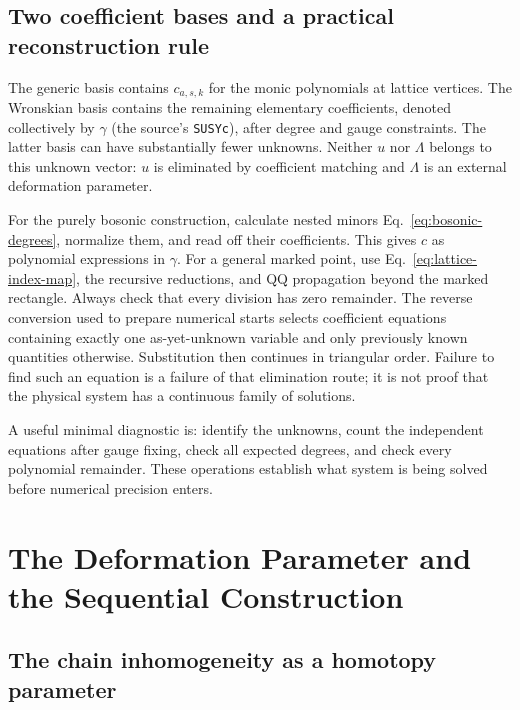\documentclass[11pt]{article}
\newcommand{\file}[1]{\texttt{#1}}
\begin{document}
\subsection{Two coefficient bases and a practical reconstruction rule}
\label{sec:bases}

The generic basis contains $c_{a,s,k}$ for the monic polynomials at lattice
vertices. The Wronskian basis contains the remaining elementary
coefficients, denoted collectively by $\gamma$ (the source's
\file{SUSYc}), after degree and gauge constraints. The latter basis can
have substantially fewer unknowns. Neither $u$ nor $\Lambda$ belongs to
this unknown vector: $u$ is eliminated by coefficient matching and
$\Lambda$ is an external deformation parameter.

For the purely bosonic construction, calculate nested minors
Eq.~\eqref{eq:bosonic-degrees}, normalize them, and read off their
coefficients. This gives $c$ as polynomial expressions in $\gamma$.
For a general marked point, use Eq.~\eqref{eq:lattice-index-map}, the
recursive reductions, and QQ propagation beyond the marked rectangle.
Always check that every division has zero remainder.
The reverse conversion used to prepare numerical starts selects
coefficient equations containing exactly one as-yet-unknown variable
and only previously known quantities otherwise. Substitution then
continues in triangular order. Failure to find such an equation is a
failure of that elimination route; it is not proof that the physical
system has a continuous family of solutions.

A useful minimal diagnostic is: identify the unknowns, count the
independent equations after gauge fixing, check all expected degrees,
and check every polynomial remainder. These operations establish what
system is being solved before numerical precision enters.

\section{The Deformation Parameter and the Sequential Construction}
\label{sec:asymptotics}

\subsection{The chain inhomogeneity as a homotopy parameter}
\label{sec:lambda-def}
\end{document}

